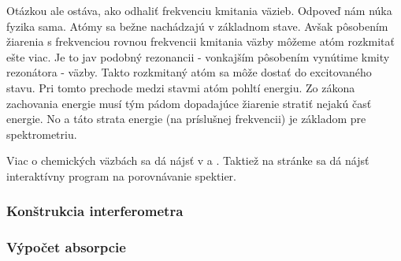 Otázkou ale ostáva, ako odhaliť frekvenciu kmitania väzieb. Odpoveď
nám núka fyzika sama. Atómy sa bežne nachádzajú v základnom stave.
Avšak pôsobením žiarenia s frekvenciou rovnou frekvencii kmitania
väzby môžeme atóm rozkmitať ešte viac. Je to jav podobný rezonancii - 
vonkajším pôsobením vynútime kmity rezonátora - väzby.
Takto rozkmitaný atóm sa môže dostať do excitovaného stavu. Pri tomto
prechode medzi stavmi atóm pohltí energiu. Zo zákona zachovania
energie musí tým pádom dopadajúce žiarenie stratiť nejakú časť
energie. No a táto strata energie (na príslušnej frekvencii) je
základom pre spektrometriu.


\begin{poznamka}
Viac o chemických väzbách sa dá nájsť v \cite{wiki:bonds} a
\cite{Chem}. Taktiež na stránke \cite{webspectra} sa dá nájsť
interaktívny program na porovnávanie spektier.
\end{poznamka}

\subsubsection{Konštrukcia interferometra}



\subsubsection{Výpočet absorpcie}


